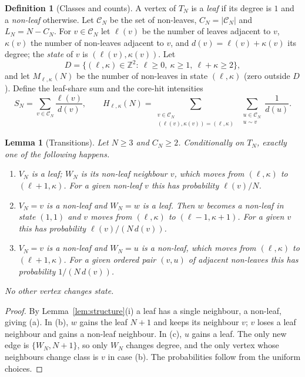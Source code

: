 \documentclass[11pt]{article}
\theoremstyle{plain}
\newtheorem{lemma}[theorem]{Lemma}
\theoremstyle{definition}
\newtheorem{definition}[theorem]{Definition}
\theoremstyle{remark}
\begin{document}
\begin{definition}[Classes and counts]
A vertex of $T_N$ is a \emph{leaf} if its degree is $1$ and a \emph{non-leaf} otherwise. Let $\mathcal{C}_N$ be the set of non-leaves, $C_N=|\mathcal{C}_N|$ and $L_N=N-C_N$. For $v\in\mathcal{C}_N$ let $\ell(v)$ be the number of leaves adjacent to $v$, $\kappa(v)$ the number of non-leaves adjacent to $v$, and $d(v)=\ell(v)+\kappa(v)$ its degree; the \emph{state} of $v$ is $(\ell(v),\kappa(v))$. Let
\[
D=\{(\ell,\kappa)\in\mathbb{Z}^2:\ \ell\ge0,\ \kappa\ge1,\ \ell+\kappa\ge2\},
\]
and let $M_{\ell,\kappa}(N)$ be the number of non-leaves in state $(\ell,\kappa)$ (zero outside $D$). Define the leaf-share sum and the core-hit intensities
\[
S_N=\sum_{v\in\mathcal{C}_N}\frac{\ell(v)}{d(v)},\qquad
H_{\ell,\kappa}(N)=\sum_{\substack{v\in\mathcal{C}_N\\(\ell(v),\kappa(v))=(\ell,\kappa)}}\ \sum_{\substack{u\in\mathcal{C}_N\\u\sim v}}\frac{1}{d(u)} .
\]
\end{definition}

\begin{lemma}[Transitions]\label{c:lem:transitions}
Let $N\ge3$ and $C_N\ge2$. Conditionally on $T_N$, exactly one of the following happens.
\begin{enumerate}
\item[(a)] $V_N$ is a leaf; $W_N$ is its non-leaf neighbour $v$, which moves from $(\ell,\kappa)$ to $(\ell+1,\kappa)$. For a given non-leaf $v$ this has probability $\ell(v)/N$.
\item[(b)] $V_N=v$ is a non-leaf and $W_N=w$ is a leaf. Then $w$ becomes a non-leaf in state $(1,1)$ and $v$ moves from $(\ell,\kappa)$ to $(\ell-1,\kappa+1)$. For a given $v$ this has probability $\ell(v)/(N\,d(v))$.
\item[(c)] $V_N=v$ is a non-leaf and $W_N=u$ is a non-leaf, which moves from $(\ell,\kappa)$ to $(\ell+1,\kappa)$. For a given ordered pair $(v,u)$ of adjacent non-leaves this has probability $1/(N\,d(v))$.
\end{enumerate}
No other vertex changes state.
\end{lemma}

\begin{proof}
By Lemma~\ref{lem:structure}(i) a leaf has a single neighbour, a non-leaf, giving (a). In (b), $w$ gains the leaf $N+1$ and keeps its neighbour $v$; $v$ loses a leaf neighbour and gains a non-leaf neighbour. In (c), $u$ gains a leaf. The only new edge is $\{W_N,N+1\}$, so only $W_N$ changes degree, and the only vertex whose neighbours change class is $v$ in case (b). The probabilities follow from the uniform choices.
\end{proof}
\end{document}
